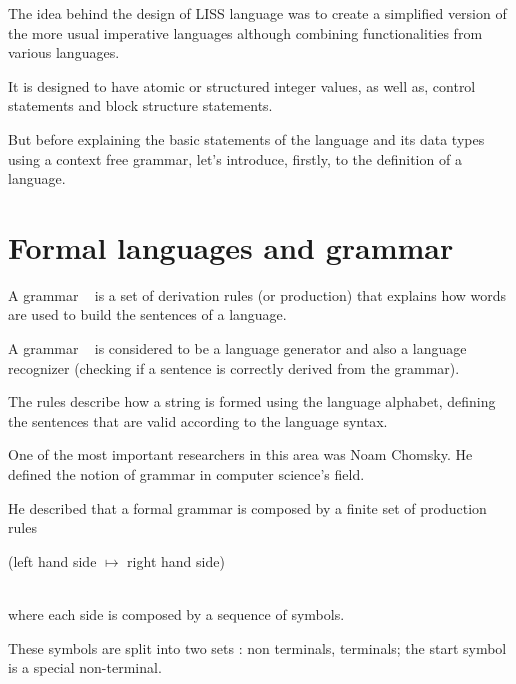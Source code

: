 \documentclass[
  oneside,
  11pt, a4paper,
  footinclude=true,
  headinclude=true,
  cleardoublepage=empty
]{scrbook}
\begin{document}
The idea behind the design of LISS language was to create a simplified version of the more usual imperative languages although combining functionalities from various languages.

It is designed to have atomic or structured integer values, as well as, control statements and block structure statements.


But before explaining the basic statements of the language and its data types using a context free grammar, let's introduce, firstly, to the definition of a language.

\section{Formal languages and grammar}

A grammar ~\citep{Chomsky62a,Gau83a,WG84a,ASU86a,Kas91c,Muchnick97,Hopcroft2006b,Grune2012a} is a set of derivation rules (or production) that explains how words are used to build the sentences of a language.

A grammar ~\citep{DJB88a,Alb91a,Kas91a,SV91a,WAGA90,Rai80a,Fil83a,OPHCC2010} is considered to be a language generator and also a language recognizer (checking if a sentence is correctly derived from the grammar).

The rules describe how a string is formed using the language alphabet, defining the sentences that are valid according to the language syntax.

One of the most important researchers in this area was Noam Chomsky. He defined the notion of grammar in computer science's field.

He described that a formal grammar is composed by a finite set of production rules \\
\centerline{(left hand side $\mapsto$ right hand side)} \\
where each side is composed by a sequence of symbols.

These symbols are split into two sets : non terminals, terminals; the start symbol is a special non-terminal.


\end{document}
